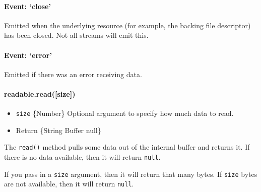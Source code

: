 \begin{Shaded}
\end{Shaded}

\paragraph{Event: `close'}

Emitted when the underlying resource (for example, the backing file
descriptor) has been closed. Not all streams will emit this.

\paragraph{Event: `error'}

Emitted if there was an error receiving data.

\paragraph{readable.read({[}size{]})}

\begin{itemize}
\item
  \texttt{size} \{Number\} Optional argument to specify how much data to
  read.
\item
  Return \{String \textbar{} Buffer \textbar{} null\}
\end{itemize}

The \texttt{read()} method pulls some data out of the internal buffer
and returns it. If there is no data available, then it will return
\texttt{null}.

If you pass in a \texttt{size} argument, then it will return that many
bytes. If \texttt{size} bytes are not available, then it will return
\texttt{null}.

